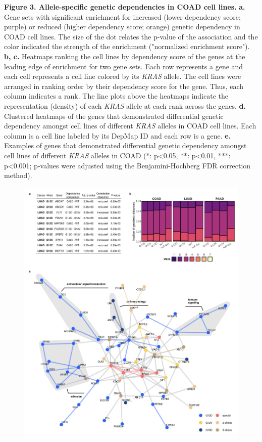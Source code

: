 \documentclass[english, 10pt, letterpaper]{article}
\newcommand{\KRAS}{\emph{KRAS}}
\begin{document}
\noindent \textbf{Figure 3. Allele-specific genetic dependencies in COAD cell lines.}
\textbf{a.} Gene sets with significant enrichment for increased (lower dependency score; purple) or reduced (higher dependency score; orange) genetic dependency in COAD cell lines. The size of the dot relates the p-value of the association and the color indicated the strength of the enrichment ("normalized enrichment score").
\textbf{b, c.} Heatmaps ranking the cell lines by dependency score of the genes at the leading edge of enrichment for two gene sets. Each row represents a gene and each cell represents a cell line colored by its \KRAS{} allele. The cell lines were arranged in ranking order by their dependency score for the gene. Thus, each column indicates a rank. The line plots above the heatmaps indicate the representation (density) of each \KRAS{} allele at each rank across the genes.
\textbf{d.} Clustered heatmaps of the genes that demonstrated differential genetic dependency amongst cell lines of different \KRAS{} alleles in COAD cell lines. Each column is a cell line labeled by its DepMap ID and each row is a gene.
\textbf{e.} Examples of genes that demonstrated differential genetic dependency amongst cell lines of different \KRAS{} alleles in COAD (*: p<0.05, **: p<0.01, ***: p<0.001; p-values were adjusted using the Benjamini-Hochberg FDR correction method).
\newpage


\begin{figure}[h!]
\centering
\includegraphics[width=180mm]{figures/Fig_4.jpeg}
\label{fig:results-integration-main}
\end{figure}
\end{document}
